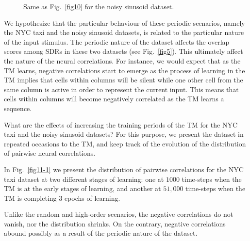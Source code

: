 \documentclass[11pt,letterpaper]{article}
\begin{document}
\begin{figure}[t]
{	    			\label{fig11:c}
		    	}
			    \caption{
			        Same as Fig.~\ref{fig10} for the noisy sinusoid dataset.
			    }
			    \label{fig11}
		    \end{figure}
		    
		    We hypothesize that the particular behaviour of these periodic scenarios, namely
		    the NYC taxi and the noisy sinusoid datasets, is related to the particular
		    nature of the input stimulus.
		    The periodic nature of the dataset affects the overlap scores among SDRs in
		    these two datasets (see Fig.~\ref{fig5}).
		    This ultimately affect the nature of the neural correlations.
		    For instance, we would expect that as the TM learns, negative correlations
		    start to emerge as the process of learning in the TM implies that cells
		    within columns will be silent while one other cell from the same column
		    is active in order to represent the current input.
		    This means that cells within columns will become negatively correlated
		    as the TM learns a sequence.
		    
		    What are the effects of increasing the training periods of the TM for
		    the NYC taxi and the noisy sinusoid datasets?
		    For this purpose, we present the dataset in repeated occasions to the
		    TM, and keep track of the evolution of the distribution of pairwise
		    neural correlations.

            In Fig.~\ref{fig11-1} we present the distribution of pairwise correlations
            for the NYC taxi dataset at two different stages of learning: one at
            $1000$ time-steps when the TM is at the early stages of learning, 
            and another at $51,000$ time-steps when the TM is completing 3 epochs
            of learning.
            
            Unlike the random and high-order scenarios, the negative correlations
            do not vanish, nor the distribution shrinks.
            On the contrary, negative correlations abound possibly as a result of
            the periodic nature of the dataset.
            
\end{document}
